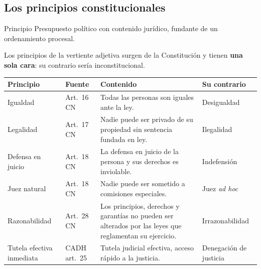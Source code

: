 \documentclass[12pt,oneside]{book}
\renewcommand{\arraystretch}{1.15}
\begin{document}
\subsection{Los principios constitucionales}

\begin{definition}{Principio}
Presupuesto político con contenido jurídico, fundante de un ordenamiento procesal.
\end{definition}

Los principios de la vertiente adjetiva surgen de la Constitución y tienen \textbf{una sola cara}: su contrario sería inconstitucional.

\begin{table}[H]
\centering
\renewcommand{\arraystretch}{1.2}
\small
\begin{tabularx}{\textwidth}{>{\RaggedRight\arraybackslash}p{2.5cm}>{\RaggedRight\arraybackslash}p{2.0cm}>{\RaggedRight\arraybackslash}X>{\RaggedRight\arraybackslash}p{3.2cm}}
\toprule
\textbf{Principio} & \textbf{Fuente} & \textbf{Contenido} & \textbf{Su contrario} \\
\midrule
Igualdad & Art.~16 CN & Todas las personas son iguales ante la ley. & Desigualdad \\
Legalidad & Art.~17 CN & Nadie puede ser privado de su propiedad sin sentencia fundada en ley. & Ilegalidad \\
Defensa en juicio & Art.~18 CN & La defensa en juicio de la persona y sus derechos es inviolable. & Indefensión \\
Juez natural & Art.~18 CN & Nadie puede ser sometido a comisiones especiales. & Juez \textit{ad hoc} \\
Razonabilidad & Art.~28 CN & Los principios, derechos y garantías no pueden ser alterados por las leyes que reglamentan su ejercicio. & Irrazonabilidad \\
Tutela efectiva inmediata & CADH art.~25 & Tutela judicial efectiva, acceso rápido a la justicia. & Denegación de justicia \\
\bottomrule
\end{tabularx}
\end{table}
\end{document}
